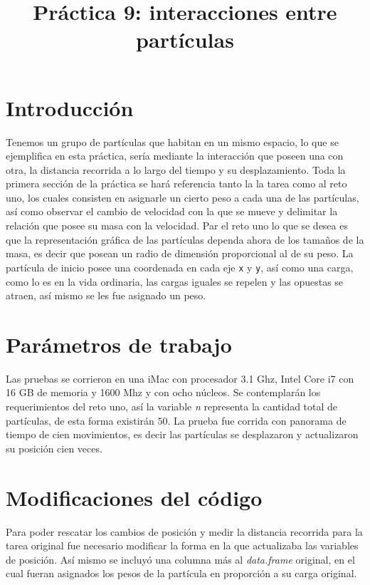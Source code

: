 \documentclass[a4paper]{article}
\title{Práctica 9: interacciones entre partículas}
\begin{document}
\maketitle

\section{Introducci\'on}
Tenemos un grupo de partículas que habitan en un mismo espacio, lo que se ejemplifica en esta práctica, sería mediante la interacción que poseen una con otra, la distancia recorrida a lo largo del tiempo y su desplazamiento. Toda la primera sección de la práctica se hará referencia tanto la la tarea como al reto uno, los cuales consisten en asignarle un cierto peso a cada una de las partículas, así como observar el cambio de velocidad con la que se mueve y delimitar la relación que posee su masa con la velocidad. Par el reto uno lo que se desea es que la representación gráfica de las partículas dependa ahora de los tamaños de la masa, es decir que posean un radio de dimensión proporcional al de su peso. La partícula de inicio posee una coordenada en cada eje \texttt{x} y \texttt{y}, así como una carga, como lo es en la vida ordinaria, las cargas iguales se repelen y las opuestas se atraen, así mismo se les fue asignado un peso.

\section{Par\'ametros de trabajo}
Las pruebas se corrieron en una iMac con procesador 3.1 Ghz, Intel Core i7 con 16 GB de memoria y 1600 Mhz y con ocho núcleos. Se contemplarán los requerimientos del reto uno, así la variable \textit{n} representa la cantidad total de partículas, de esta forma existirán $50$. La prueba fue corrida con panorama de tiempo de cien movimientos, es decir las partículas se desplazaron y actualizaron su posición cien veces.

\section{Modificaciones del código}
Para poder rescatar los cambios de posición y medir la distancia recorrida para la tarea original fue necesario modificar la forma en la que actualizaba las variables de posición. Así mismo se incluyó una columna más al \textit{data.frame} original, en el cual fueran asignados los pesos de la partícula en proporción a su carga original.
\end{document}
